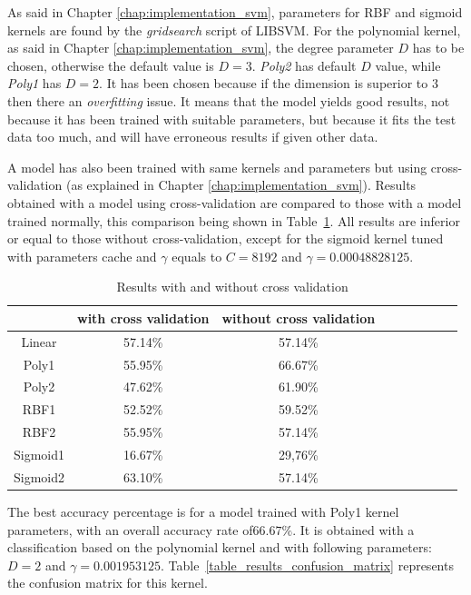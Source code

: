 \noindent As said in Chapter \ref{chap:implementation_svm}, parameters for RBF and sigmoid kernels are found by the \textit{gridsearch} script of LIBSVM. For the polynomial kernel, as said in Chapter \ref{chap:implementation_svm}, the degree parameter $D$ has to be chosen, otherwise the default value is $D=3$. \textit{Poly2} has default $D$ value, while \textit{Poly1} has $D = 2$. It has been chosen because if the dimension is superior to $3$ then there an \textit{overfitting} issue. It means that the model yields good results, not because it has been trained with suitable parameters, but because it fits the test data too much, and will have erroneous results if given other data.
\newline

\noindent A model has also been trained with same kernels and parameters but using cross-validation (as explained in Chapter \ref{chap:implementation_svm}). Results obtained with a model using cross-validation are compared to those with a model trained normally, this comparison being shown in  Table~\ref{table_results_crossvalidation}. All results are inferior or equal to those without cross-validation, except for the sigmoid kernel tuned with parameters cache and $\gamma$ equals to $ C = 8192 $ and $ \gamma = 0.00048828125 $.
\newline

\begin{table}[h]
\begin{center}
   \caption{\label{table_results_crossvalidation} Results with and without cross validation}
\begin{tabular}{|c|c|c|c|c|c|c|c|c|}
  \hline
    & with cross validation & without cross validation \\
  \hline
  Linear & 57.14\% & 57.14\% \\
  Poly1 & 55.95\% & 66.67\% \\
  Poly2 & 47.62\% & 61.90\% \\
  RBF1 & 52.52\% & 59.52\% \\
  RBF2 & 55.95\% & 57.14\% \\
  Sigmoid1 & 16.67\% & 29,76\% \\
  Sigmoid2 & 63.10\% & 57.14\% \\
  \hline
\end{tabular}
\end{center}
\end{table}

\noindent The best accuracy percentage is for a model trained with Poly1 kernel parameters, with an overall accuracy rate of$ 66.67\% $. It is obtained with a classification based on the polynomial kernel and with following parameters: $ D = 2 $ and $ \gamma = 0.001953125 $. Table~\ref{table_results_confusion_matrix} represents the confusion matrix for this kernel.
\newline

